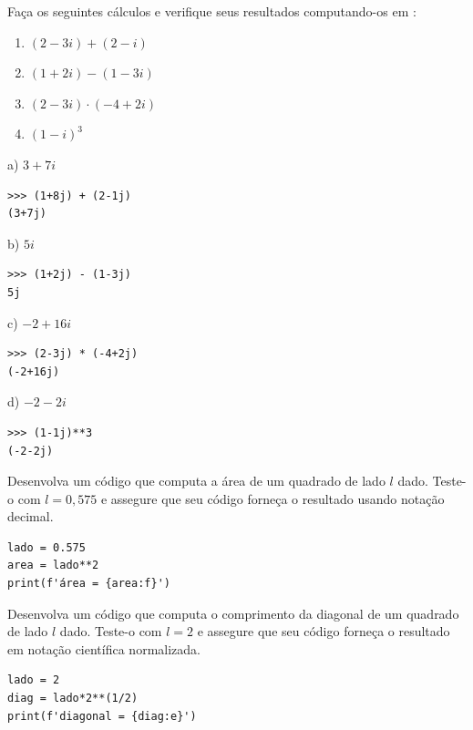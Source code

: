 \begin{exer}
  Faça os seguintes cálculos e verifique seus resultados computando-os em {\python}:
  \begin{enumerate}
  \item $(2-3i) + (2-i)$
  \item $(1+2i) - (1-3i)$
  \item $(2-3i) \cdot (-4+2i)$
  \item $(1-i)^3$
  \end{enumerate}
\end{exer}
\begin{resp}
  a) $3+7i$

\begin{lstlisting}
>>> (1+8j) + (2-1j)
(3+7j)
\end{lstlisting}

  b) $5i$

\begin{lstlisting}
>>> (1+2j) - (1-3j)
5j
\end{lstlisting}

  c) $-2+16i$

\begin{lstlisting}
>>> (2-3j) * (-4+2j)
(-2+16j)
\end{lstlisting}

  d) $-2-2i$

\begin{lstlisting}
>>> (1-1j)**3
(-2-2j)
\end{lstlisting}

\end{resp}

\begin{exer}
  Desenvolva um código {\python} que computa a área de um quadrado de lado $l$ dado. Teste-o com $l=0,575$ e assegure que seu código forneça o resultado usando notação decimal.
\end{exer}
\begin{resp}

\begin{lstlisting}
lado = 0.575
area = lado**2
print(f'área = {area:f}')
\end{lstlisting}

\end{resp}

\begin{exer}
  Desenvolva um código {\python} que computa o comprimento da diagonal de um quadrado de lado $l$ dado. Teste-o com $l=2$ e assegure que seu código forneça o resultado em notação científica normalizada.
\end{exer}
\begin{resp}

\begin{lstlisting}
lado = 2
diag = lado*2**(1/2)
print(f'diagonal = {diag:e}')
\end{lstlisting}

\end{resp}

